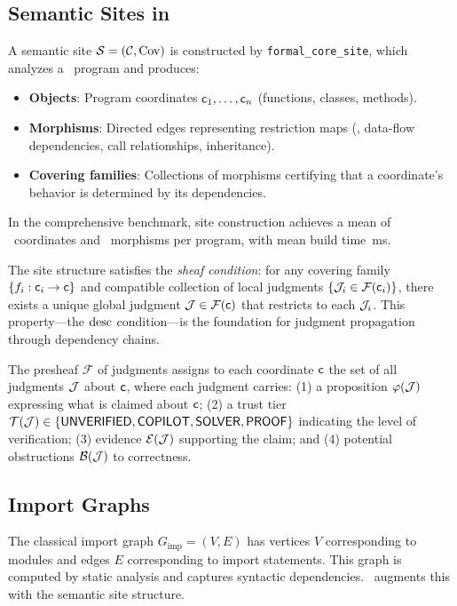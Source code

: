 \documentclass[11pt]{article}
\newcommand{\FormalSite}{\texttt{formal\_core\_site}}
\begin{document}
\subsection{Semantic Sites in \JuGeo}
A semantic site $\mathcal{S} = (\mathcal{C}, \mathrm{Cov})$ is constructed by
\FormalSite, which analyzes a \Python\ program and produces:
\begin{itemize}[noitemsep]
  \item \textbf{Objects}: Program coordinates $\mathsf{c}_1, \ldots, \mathsf{c}_n$
        (functions, classes, methods).
  \item \textbf{Morphisms}: Directed edges representing restriction maps
        (\ie, data-flow dependencies, call relationships, inheritance).
  \item \textbf{Covering families}: Collections of morphisms certifying
        that a coordinate's behavior is determined by its dependencies.
\end{itemize}
In the comprehensive benchmark, site construction achieves a mean of
\compSiteMeanCoords\ coordinates and \compSiteMeanMorphisms\ morphisms per
program, with mean build time \compSiteMeanBuildMs\,ms.

The site structure satisfies the \emph{sheaf condition}: for any covering
family $\{f_i : \mathsf{c}_i \to \mathsf{c}\}$ and compatible collection of local
judgments $\{\mathcal{J}_i \in \mathcal{F}(\mathsf{c}_i)\}$, there exists a unique
global judgment $\mathcal{J} \in \mathcal{F}(\mathsf{c})$ that restricts to each $\mathcal{J}_i$.
This property---the $\mathrm{desc}$ condition---is the foundation for judgment
propagation through dependency chains.

The presheaf $\mathcal{F}$ of judgments assigns to each coordinate $\mathsf{c}$
the set of all judgments $\mathcal{J}$ about $\mathsf{c}$, where each judgment carries:
(1) a proposition $\varphi(\mathcal{J})$ expressing what is claimed about $\mathsf{c}$;
(2) a trust tier $\mathcal{T}(\mathcal{J}) \in \{\mathsf{UNVERIFIED}, \mathsf{COPILOT}, \mathsf{SOLVER}, \mathsf{PROOF}\}$
indicating the level of verification; (3) evidence $\mathcal{E}(\mathcal{J})$ supporting
the claim; and (4) potential obstructions $\mathcal{B}(\mathcal{J})$ to correctness.

\subsection{Import Graphs}
The classical import graph $G_{\mathrm{imp}} = (V, E)$ has vertices $V$
corresponding to modules and edges $E$ corresponding to import statements.
This graph is computed by static analysis and captures syntactic
dependencies.  \JuGeo\ augments this with the semantic site structure.
\end{document}

